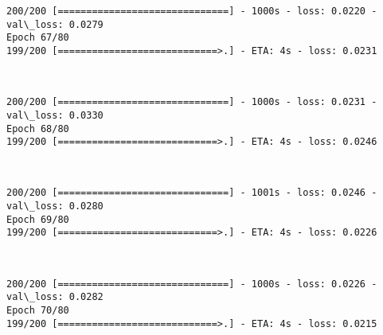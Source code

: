 \documentclass[11pt]{article}
\begin{document}
    \begin{Verbatim}[commandchars=\\\{\}]
200/200 [==============================] - 1000s - loss: 0.0220 - val\_loss: 0.0279
Epoch 67/80
199/200 [============================>.] - ETA: 4s - loss: 0.0231
    \end{Verbatim}

    \begin{center}
    \end{center}
    { \hspace*{\fill} \\}
    
    \begin{Verbatim}[commandchars=\\\{\}]
200/200 [==============================] - 1000s - loss: 0.0231 - val\_loss: 0.0330
Epoch 68/80
199/200 [============================>.] - ETA: 4s - loss: 0.0246
    \end{Verbatim}

    \begin{center}
    \end{center}
    { \hspace*{\fill} \\}
    
    \begin{Verbatim}[commandchars=\\\{\}]
200/200 [==============================] - 1001s - loss: 0.0246 - val\_loss: 0.0280
Epoch 69/80
199/200 [============================>.] - ETA: 4s - loss: 0.0226
    \end{Verbatim}

    \begin{center}
    \end{center}
    { \hspace*{\fill} \\}
    
    \begin{Verbatim}[commandchars=\\\{\}]
200/200 [==============================] - 1000s - loss: 0.0226 - val\_loss: 0.0282
Epoch 70/80
199/200 [============================>.] - ETA: 4s - loss: 0.0215
    \end{Verbatim}

    \begin{center}
    \end{center}
    { \hspace*{\fill} \\}
    
\end{document}
